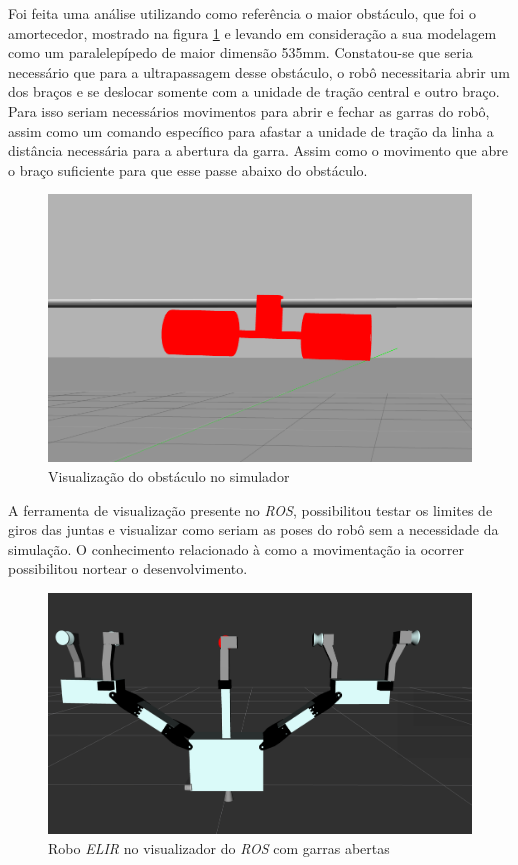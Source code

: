 Foi feita uma análise utilizando como referência o maior obstáculo, que foi o amortecedor, mostrado na figura \ref{fig:amortecedor} e levando em consideração a sua modelagem como um paralelepípedo de maior dimensão 535mm. Constatou-se que seria necessário que para a ultrapassagem desse obstáculo, o robô necessitaria abrir um dos braços e se deslocar somente com a unidade de tração central e outro braço. Para isso seriam necessários movimentos para abrir e fechar as garras do robô, assim como um comando específico para afastar a unidade de tração da linha a distância necessária para a abertura da garra. Assim como o movimento que abre o braço suficiente para que esse passe abaixo do obstáculo.

\begin{figure}[H]
	\centering
	\includegraphics[scale=0.25]{Figures/obstaculo.png}
	\caption{Visualização do obstáculo no simulador}
	\label{fig:amortecedor}
\end{figure}

A ferramenta de visualização presente no \textit{ROS}, possibilitou testar os limites de giros das juntas e visualizar como seriam as poses do robô sem a necessidade da simulação. O conhecimento relacionado à como a movimentação ia ocorrer possibilitou nortear o desenvolvimento.

\begin{figure}[H]
	\centering
	\includegraphics[scale=0.25]{Figures/rviz_garra_aberta.png}
	\caption{Robo \textit{ELIR} no visualizador do \textit{ROS} com garras abertas}
	\label{fig:elir_garras abertas}
\end{figure}

